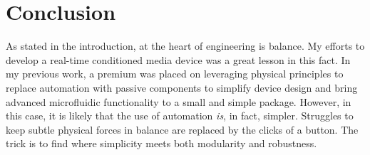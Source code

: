 \chapter*{Conclusion}
As stated in the introduction, at the heart of engineering is balance. My efforts to develop a real-time conditioned media device was a great lesson in this fact. In my previous work, a premium was placed on leveraging physical principles to replace automation with passive components to simplify device design and bring advanced microfluidic functionality to a small and simple package. However, in this case, it is likely that the use of automation \emph{is}, in fact, simpler. Struggles to keep subtle physical forces in balance are replaced by the clicks of a button. The trick is to find where simplicity meets both modularity and robustness.